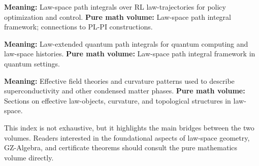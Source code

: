 \documentclass[11pt]{book}
\theoremstyle{plain}
\theoremstyle{definition}
\theoremstyle{remark}
\begin{document}
\begin{description}
    \textbf{Meaning:} Law-space path integrals over RL
    law-trajectories for policy optimization and control.
    \textbf{Pure math volume:} Law-space path integral framework;
    connections to PL-PI constructions.
  \item[\textbf{Quantum law-space path integrals}]
    \textbf{Meaning:} Law-extended quantum path integrals for quantum
    computing and law-space histories.
    \textbf{Pure math volume:} Law-space path integral framework in
    quantum settings.
  \item[\textbf{Law-space EFTs and curvature}]
    \textbf{Meaning:} Effective field theories and curvature patterns
    used to describe superconductivity and other condensed matter
    phases.
    \textbf{Pure math volume:} Sections on effective law-objects,
    curvature, and topological structures in law-space.
\end{description}

This index is not exhaustive, but it highlights the main bridges
between the two volumes. Readers interested in the foundational
aspects of law-space geometry, GZ-Algebra, and certificate theorems
should consult the pure mathematics volume directly.



\clearpage
\end{document}
